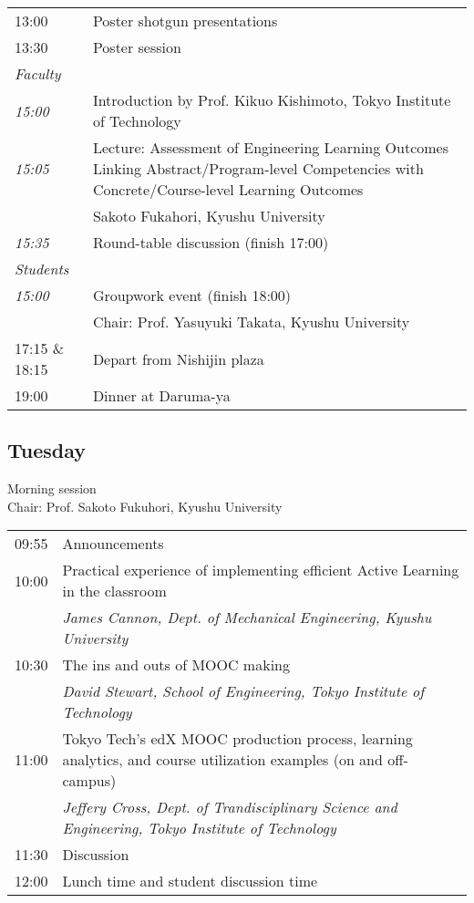 \noindent\begin{tabular}{|l|l|}
    \hline
    13:00   & Poster shotgun presentations \\
    13:30   & Poster session \\
    \emph{Faculty} & \\
    \hspace{1em}\emph{15:00} & Introduction by Prof. Kikuo Kishimoto, Tokyo Institute of Technology \\
    \hspace{1em}\emph{15:05} & Lecture: Assessment of Engineering Learning Outcomes Linking Abstract/Program-level Competencies with Concrete/Course-level Learning Outcomes \\
            & Sakoto Fukahori, Kyushu University \\
    \hspace{1em}\emph{15:35} & Round-table discussion (finish 17:00) \\
    \emph{Students} & \\
    \hspace{1em}\emph{15:00} & Groupwork event (finish 18:00) \\
            & Chair: Prof. Yasuyuki Takata, Kyushu University \\
    17:15 \& 18:15   & Depart from Nishijin plaza \\
    19:00   & Dinner at Daruma-ya \\
    \hline
\end{tabular}

\subsection*{Tuesday}

\vspace{2em}
Morning session \\
Chair: Prof. Sakoto Fukuhori, Kyushu University

\noindent\begin{tabular}{|l|l|}
    \hline
    09:55   & Announcements \\
    10:00   & Practical experience of implementing efficient Active Learning in the classroom \\
            & \emph{James Cannon, Dept. of Mechanical Engineering, Kyushu University} \\
    10:30   & The ins and outs of MOOC making \\
            & \emph{David Stewart, School of Engineering, Tokyo Institute of Technology} \\
    11:00   & Tokyo Tech’s edX MOOC production process, learning analytics, and course utilization examples (on and off-campus) \\
            & \emph{Jeffery Cross, Dept. of Trandisciplinary Science and Engineering, Tokyo Institute of Technology} \\
    11:30   & Discussion \\
    12:00   & Lunch time and student discussion time \\

    \hline
\end{tabular}

